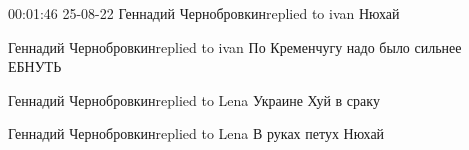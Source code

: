  
 
 
 
 

00:01:46 25-08-22
Геннадий Чернобровкинreplied to ivan
Нюхай

Геннадий Чернобровкинreplied to ivan
По Кременчугу надо было сильнее ЕБНУТЬ

Геннадий Чернобровкинreplied to Lena
Украине Хуй в сраку

Геннадий Чернобровкинreplied to Lena
В руках петух Нюхай
